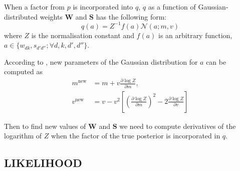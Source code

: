 \documentclass[letterpaper]{article}
\begin{document}
When a factor from $p$ is incorporated into $q$, $q$ as a function of Gaussian-distributed weights $\mathbf{W}$ and $\mathbf{S}$ has the following form:
\begin{equation}
q(a) = Z^{-1}f(a)\mathcal{N}(a; m, v)
\end{equation}
where $Z$ is the normalisation constant and $f(a)$ is an arbitrary function, $a \in \{w_{dk}, s_{d'd''}; \forall d, k, d', d''\}$.

According to \cite{minka2001thesis}, new parameters of the Gaussian distribution for $a$ can be computed as
\begin{align}
m^{\text{new}} &= m + v \frac{\partial \log Z}{\partial m}, \\
v^{\text{new}} &= v - v^2\left[ \left(\frac{\partial \log Z}{\partial m}\right)^2 - 2 \frac{\partial \log Z}{\partial v}\right]
\end{align}

Then to find new values of $\mathbf{W}$ and $\mathbf{S}$ we need to compute derivatives of the logarithm of $Z$ when the factor of the true posterior is incorporated in $q$.

\subsection{\uppercase{Likelihood}}
\end{document}
